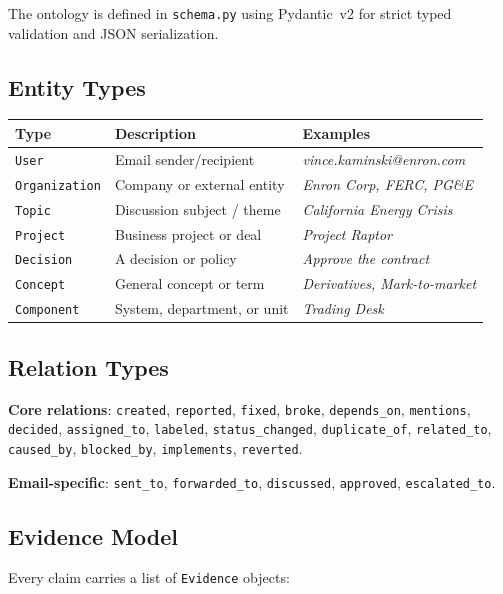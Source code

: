 \documentclass[11pt,a4paper]{article}
\begin{document}
The ontology is defined in \texttt{schema.py} using Pydantic~v2 for strict typed validation and JSON serialization.

\subsection{Entity Types}

\begin{center}
\begin{tabular}{lll}
\toprule
\textbf{Type} & \textbf{Description} & \textbf{Examples} \\
\midrule
\texttt{User} & Email sender/recipient & \textit{vince.kaminski@enron.com} \\
\texttt{Organization} & Company or external entity & \textit{Enron Corp, FERC, PG\&E} \\
\texttt{Topic} & Discussion subject / theme & \textit{California Energy Crisis} \\
\texttt{Project} & Business project or deal & \textit{Project Raptor} \\
\texttt{Decision} & A decision or policy & \textit{Approve the contract} \\
\texttt{Concept} & General concept or term & \textit{Derivatives, Mark-to-market} \\
\texttt{Component} & System, department, or unit & \textit{Trading Desk} \\
\bottomrule
\end{tabular}
\end{center}

\subsection{Relation Types}

\textbf{Core relations}: \texttt{created}, \texttt{reported}, \texttt{fixed}, \texttt{broke}, \texttt{depends\_on}, \texttt{mentions}, \texttt{decided}, \texttt{assigned\_to}, \texttt{labeled}, \texttt{status\_changed}, \texttt{duplicate\_of}, \texttt{related\_to}, \texttt{caused\_by}, \texttt{blocked\_by}, \texttt{implements}, \texttt{reverted}.

\textbf{Email-specific}: \texttt{sent\_to}, \texttt{forwarded\_to}, \texttt{discussed}, \texttt{approved}, \texttt{escalated\_to}.

\subsection{Evidence Model}
Every claim carries a list of \texttt{Evidence} objects:
\end{document}

